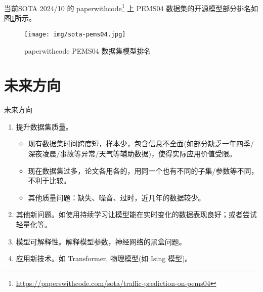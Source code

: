 \documentclass{libs/format}
\begin{document}
\begin{frame}{当前SOTA}
  2024/10 的 paperwithcode\footnote[frame]{\url{https://paperswithcode.com/sota/traffic-prediction-on-pems04}} 上 PEMS04 数据集的开源模型部分排名如图\ref{fig:sota-pems04}所示。

  \begin{figure}
    \centering
    \texttt{[image: img/sota-pems04.jpg]}
    \caption{paperwithcode PEMS04 数据集模型排名}\label{fig:sota-pems04}
  \end{figure}
\end{frame}

\section{未来方向}
\begin{frame}{未来方向}
  \begin{enumerate}
    \item 提升数据集质量。
    \begin{itemize}
      \item 现有数据集时间跨度短，样本少，包含信息不全面(如部分缺乏一年四季/深夜凌晨/事故等异常/天气等辅助数据)，使得实际应用价值受限。
      \item 现在数据集过多，论文各用各的，用同一个也有不同的子集/参数等不同，不利于比较。
      \item 其他质量问题：缺失、噪音、过时，近几年的数据较少。
    \end{itemize}
    \item 其他新问题。如使用持续学习让模型能在实时变化的数据表现良好；或者尝试轻量化等。
    \item 模型可解释性。解释模型参数，神经网络的黑盒问题。
    \item 应用新技术。如 Transformer, 物理模型(如 Ising 模型\cite{T-233})。
  \end{enumerate}
\end{frame}

\begin{frame}
    \printbibliography[title = {参考文献}]
\end{frame}
\end{document}
